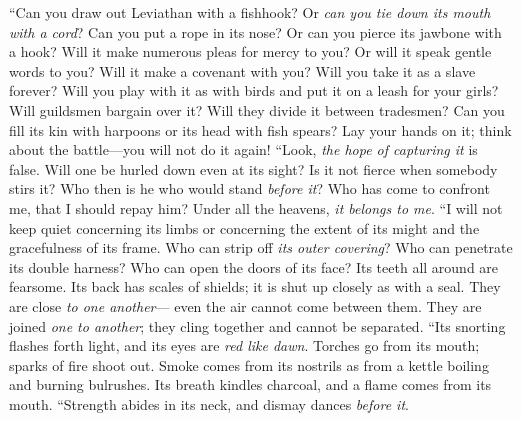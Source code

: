 \begin{biblechapter} %
\verse {} “Can you draw out Leviathan with a fishhook? 
Or \textit{can you tie down its mouth with a cord}?
\verse Can you put a rope in its nose? 
Or can you pierce its jawbone with a hook?
\verse Will it make numerous pleas for mercy to you? 
Or will it speak gentle words to you?
\verse Will it make a covenant with you? 
Will you take it as a slave forever?
\verse Will you play with it as with birds 
and put it on a leash for your girls?
\verse Will guildsmen bargain over it? 
Will they divide it between tradesmen?
\verse Can you fill its kin with harpoons 
or its head with fish spears?
\verse Lay your hands on it; 
think about the battle—you will not do it again!
\verse “Look, \textit{the hope of capturing it} is false. 
Will one be hurled down even at its sight?
\verse Is it not fierce when somebody stirs it? 
Who then is he who would stand \textit{before it}?
\verse Who has come to confront me, that I should repay him? 
Under all the heavens, \textit{it belongs to me}.
\verse “I will not keep quiet concerning its limbs 
or concerning the extent of its might and the gracefulness of its frame.
\verse Who can strip off \textit{its outer covering}? 
Who can penetrate its double harness?
\verse Who can open the doors of its face? 
Its teeth all around are fearsome.
\verse Its back has scales of shields; 
it is shut up closely as with a seal.
\verse They are close \textit{to one another}— 
even the air cannot come between them.
\verse They are joined \textit{one to another}; 
they cling together and cannot be separated.
\verse “Its snorting flashes forth light, 
and its eyes are \textit{red like dawn}.
\verse Torches go from its mouth; 
sparks of fire shoot out.
\verse Smoke comes from its nostrils 
as from a kettle boiling and burning bulrushes.
\verse Its breath kindles charcoal, 
and a flame comes from its mouth.
\verse “Strength abides in its neck, 
and dismay dances \textit{before it}.

\end{biblechapter}
